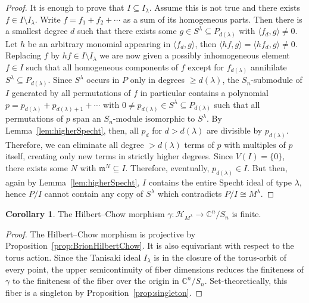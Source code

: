 \documentclass[11pt]{amsart}
\theoremstyle{definition}
\newtheorem{corollary}[theorem]{Corollary}
\newcommand{\CC}{\mathbb{C}}
\newcommand{\mm}{\mathfrak{m}}
\newcommand{\HH}{\mathcal{H}}
\begin{document}
\begin{proof}
    It is enough to prove that $I \subseteq I_\lambda$. Assume this is not true and there exists $f \in I \setminus I_\lambda$. Write $f = f_1 + f_2 + \cdots$ as a sum of its homogeneous parts. Then there is a smallest degree $d$ such that there exists some $g \in S^\lambda \subseteq P_{d(\lambda)}$ with $\langle f_d, g \rangle \neq 0$. Let $h$ be an arbitrary monomial appearing in $\langle f_d, g \rangle$, then $\langle hf, g \rangle = \langle hf_d, g \rangle \neq 0$. Replacing $f$ by $hf \in I \setminus I_\lambda$ we are now given a possibly inhomogeneous element $f \in I$ such that all homogeneous components of $f$ except for $f_{d(\lambda)}$ annihilate $S^\lambda \subseteq P_{d(\lambda)}$. Since $S^\lambda$ occurs in $P$ only in degrees $\geq d(\lambda)$, the $S_n$-submodule of $I$ generated by all permutations of $f$ in particular contains a polynomial $p = p_{d(\lambda)} + p_{d(\lambda)+1} + \cdots$ with $0 \neq p_{d(\lambda)} \in S^\lambda \subseteq P_{d(\lambda)}$ such that all permutations of $p$ span an $S_n$-module isomorphic to $S^\lambda$. By Lemma~\ref{lem:higherSpecht}, then, all $p_d$ for $d > d(\lambda)$ are divisible by $p_{d(\lambda)}$. Therefore, we can eliminate all degree $>d(\lambda)$ terms of $p$ with multiples of $p$ itself, creating only new terms in strictly higher degrees. Since $V(I) = \{0\}$, there exists some $N$ with $\mm^N \subseteq I$. Therefore, eventually, $p_{d(\lambda)} \in I$. But then, again by Lemma~\ref{lem:higherSpecht}, $I$ contains the entire Specht ideal of type $\lambda$, hence $P/I$ cannot contain any copy of $S^\lambda$ which contradicts $P/I \cong M^\lambda$.
\end{proof}

\begin{corollary}\label{corollary:HilbChowFinite}
    The Hilbert--Chow morphism $\gamma \colon \HH_{M^\lambda} \longrightarrow \CC^n/S_n$ is finite.
\end{corollary}

\begin{proof}
    The Hilbert--Chow morphism is projective by Proposition~\ref{prop:BrionHilbertChow}. It is also equivariant with respect to the torus action. Since the Tanisaki ideal $I_\lambda$ is in the closure of the torus-orbit of every point, the upper semicontinuity of fiber dimensions reduces the finiteness of $\gamma$ to the finiteness of the fiber over the origin in $\CC^n/S_n$. Set-theoretically, this fiber is a singleton by Proposition~\ref{prop:singleton}.
\end{proof}
\end{document}
